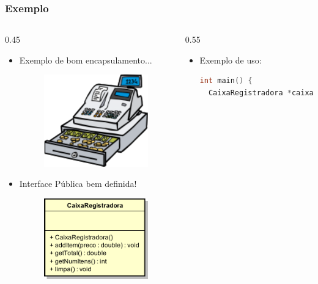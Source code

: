\documentclass[aspectratio=169]{beamer}
\begin{document}
\begin{frame}[fragile]\frametitle{Exemplo}
\begin{columns}
\begin{column}{0.45\linewidth}
\begin{itemize}
	\item Exemplo de bom encapsulamento...
	\begin{figure}[h]
		\centering
		\includegraphics[height=0.2\paperheight]{imagens/caixa.png}
	\end{figure}
	\item Interface Pública bem definida!
	\begin{figure}[h]
		\centering
		\includegraphics[height=0.3\paperheight]{imagens/caixa_sem_atributos.png}
	\end{figure}
\end{itemize}
\end{column}
\begin{column}{0.55\linewidth}
\begin{itemize}
	\item Exemplo de uso:
\begin{lstlisting}[language=C++,basicstyle=\ttfamily\tiny]
int main() {
  CaixaRegistradora *caixa = new CaixaRegistradora();


\end{lstlisting}
\end{itemize}
\end{column}
\end{columns}
\end{frame}
\end{document}

